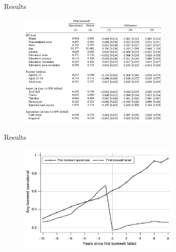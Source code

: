 \documentclass[10pt]{beamer}
\begin{document}
\begin{frame}
	{Results}
	\begin{figure}
		\centering
		\includegraphics[width=0.65\textwidth]{table2.png}
	\end{figure}
\end{frame}


\begin{frame}
	{Results}
	\begin{figure}
		\centering
		\includegraphics[width=0.7\textwidth]{figure4.png}
	\end{figure}
\end{frame}
\end{document}
